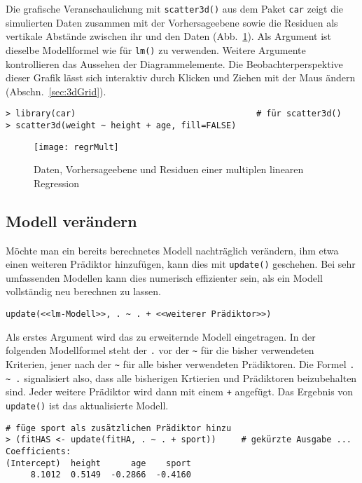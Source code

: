 Die grafische Veranschaulichung mit \lstinline!scatter3d()! aus dem Paket \lstinline!car! zeigt die simulierten Daten zusammen mit der Vorhersageebene sowie die Residuen als vertikale Abstände zwischen ihr und den Daten (Abb.\ \ref{fig:regrMult}). Als Argument ist dieselbe Modellformel wie für \lstinline!lm()! zu verwenden. Weitere Argumente kontrollieren das Aussehen der Diagrammelemente. Die Beobachterperspektive dieser Grafik lässt sich interaktiv durch Klicken und Ziehen mit der Maus ändern (Abschn.\ \ref{sec:3dGrid}).
\begin{lstlisting}
> library(car)                                    # für scatter3d()
> scatter3d(weight ~ height + age, fill=FALSE)
\end{lstlisting}

\begin{figure}[ht]
\centering
\texttt{[image: regrMult]}
\vspace*{-1em}
\caption{Daten, Vorhersageebene und Residuen einer multiplen linearen Regression}
\label{fig:regrMult}
\end{figure}

\subsection{Modell verändern}
\label{sec:regrUpdate}

Möchte man ein bereits berechnetes Modell nachträglich verändern, ihm etwa einen weiteren Prädiktor hinzufügen, kann dies mit \lstinline!update()! geschehen. Bei sehr umfassenden Modellen kann dies numerisch effizienter sein, als ein Modell vollständig neu berechnen zu lassen.
\begin{lstlisting}
update(<<lm-Modell>>, . ~ . + <<weiterer Prädiktor>>)
\end{lstlisting}

Als erstes Argument wird das zu erweiternde Modell eingetragen. In der folgenden Modellformel steht der \lstinline!.! vor der \lstinline!~! für die bisher verwendeten Kriterien, jener nach der \lstinline!~! für alle bisher verwendeten Prädiktoren. Die Formel \lstinline!. ~ .! signalisiert also, dass alle bisherigen Krtierien und Prädiktoren beizubehalten sind. Jeder weitere Prädiktor wird dann mit einem \lstinline!+! angefügt. Das Ergebnis von \lstinline!update()! ist das aktualisierte Modell.
\begin{lstlisting}
# füge sport als zusätzlichen Prädiktor hinzu
> (fitHAS <- update(fitHA, . ~ . + sport))     # gekürzte Ausgabe ...
Coefficients:
(Intercept)  height      age    sport
     8.1012  0.5149  -0.2866  -0.4160
\end{lstlisting}

